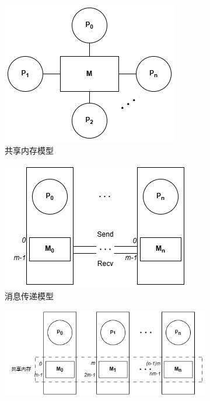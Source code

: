 {\begin{figure}[!htbp]
    \centering
    \begin{subfigure}[b]{0.35\textwidth}
      \includegraphics[width=\textwidth]{Img/multi-core.png}
      \caption{共享内存模型}
      \label{fig:multi-core}
    \end{subfigure}%
    \hspace{1.5cm}
    \begin{subfigure}[b]{0.35\textwidth}
      \includegraphics[width=\textwidth]{Img/message-passing.png}
      \caption{消息传递模型}
      \label{fig:message-passing}
    \end{subfigure}
    \begin{subfigure}[b]{0.6\textwidth}
      \includegraphics[width=\textwidth]{Img/dsm.png}

\end{subfigure}
\end{figure}}
